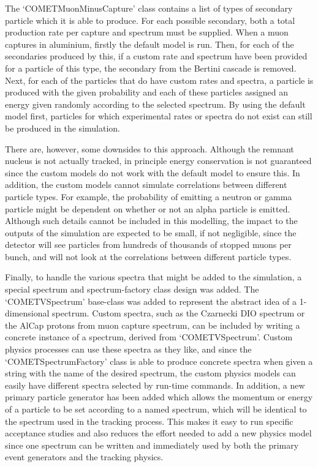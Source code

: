 The `COMETMuonMinusCapture' class contains a list of types of secondary particle which it is able to produce.  
For each possible secondary, both a total production rate per capture and spectrum must be supplied.
When a muon captures in aluminium, firstly the default model is run.
Then, for each of the secondaries produced by this, if a custom rate and spectrum have been provided for a particle of this type, the secondary from the Bertini cascade is removed.
Next, for each of the particles that do have custom rates and spectra, a particle is produced with the given probability and each of these particles assigned an energy given randomly according to the selected spectrum.
By using the default model first, particles for which experimental rates or spectra do not exist can still be produced in the simulation.

There are, however, some downsides to this approach.
Although the remnant nucleus is not actually tracked, in principle energy conservation is not guaranteed since the custom models do not work with the default model to ensure this.
In addition, the custom models cannot simulate correlations between different particle types. 
For example, the probability of emitting a neutron or gamma particle might be dependent on whether or not an alpha particle is emitted. 
Although such details cannot be included in this modelling, the impact to the outputs of the simulation are expected to be small, if not negligible, since the detector will see particles from hundreds of thousands of stopped muons per bunch, and will not look at the correlations between different particle types.

Finally, to handle the various spectra that might be added to the simulation, a special spectrum and spectrum-factory class design was added.
The `COMETVSpectrum' base-class was added to represent the abstract idea of a 1-dimensional spectrum.
Custom spectra, such as the Czarnecki \ac{DIO} spectrum or the AlCap protons from muon capture spectrum, can be included by writing a concrete instance of a spectrum, derived from `COMETVSpectrum'.
Custom physics processes can use these spectra as they like, and since the `COMETSpectrumFactory' class is able to produce concrete spectra when given a string with the name of the desired spectrum, the custom physics models can easily have different spectra selected by run-time commands.
In addition, a new primary particle generator has been added which allows the momentum or energy of a particle to be set according to a named spectrum, which will be identical to the spectrum used in the tracking process.
This makes it easy  to run specific acceptance studies and also reduces the effort needed to add a new physics model since one spectrum can be written and immediately used by both the primary event generators and the tracking physics.

